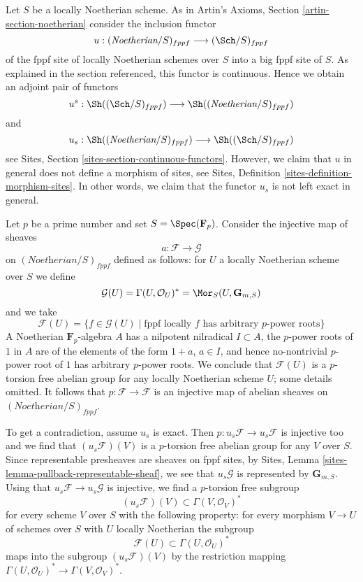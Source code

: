 \noindent
Let $S$ be a locally Noetherian scheme. As in
Artin's Axioms, Section \ref{artin-section-noetherian}
consider the inclusion functor
$$
u : (\textit{Noetherian}/S)_{fppf} \longrightarrow (\Sch/S)_{fppf}
$$
of the fppf site of locally Noetherian schemes over $S$ into a
big fppf site of $S$. As explained in the section referenced,
this functor is continuous. Hence we obtain an adjoint pair of functors
$$
u^s :
\Sh((\Sch/S)_{fppf})
\longrightarrow
\Sh((\textit{Noetherian}/S)_{fppf})
$$
and
$$
u_s :
\Sh((\textit{Noetherian}/S)_{fppf})
\longrightarrow
\Sh((\Sch/S)_{fppf})
$$
see Sites, Section \ref{sites-section-continuous-functors}.
However, we claim that $u$ in general does not define a
morphism of sites, see Sites, Definition \ref{sites-definition-morphism-sites}.
In other words, we claim that the functor $u_s$ is not left exact in general.

\medskip\noindent
Let $p$ be a prime number and set $S = \Spec(\mathbf{F}_p)$.
Consider the injective map of sheaves
$$
a : \mathcal{F} \longrightarrow \mathcal{G}
$$
on $(\textit{Noetherian}/S)_{fppf}$ defined as follows: for $U$
a locally Noetherian scheme over $S$ we define
$$
\mathcal{G}(U) = \Gamma(U, \mathcal{O}_U)^* =
\Mor_S(U, \mathbf{G}_{m, S})
$$
and we take
$$
\mathcal{F}(U) = \{f \in \mathcal{G}(U) \mid \text{fppf locally }f
\text{ has arbitrary }p\text{-power roots}\}
$$
A Noetherian $\mathbf{F}_p$-algebra $A$ has a nilpotent nilradical
$I \subset A$, the $p$-power roots of $1$ in $A$ are of the
elements of the form $1 + a$, $a \in I$, and hence no-nontrivial
$p$-power root of $1$ has arbitrary $p$-power roots. We conclude
that $\mathcal{F}(U)$ is a $p$-torsion free abelian group for any
locally Noetherian scheme $U$; some details omitted. It follows that
$p : \mathcal{F} \to \mathcal{F}$
is an injective map of abelian sheaves on $(\textit{Noetherian}/S)_{fppf}$.

\medskip\noindent
To get a contradiction, assume $u_s$ is exact. Then
$p : u_s\mathcal{F} \to u_s\mathcal{F}$ is injective too
and we find that $(u_s\mathcal{F})(V)$ is a $p$-torsion
free abelian group for any $V$ over $S$. Since
representable presheaves are sheaves on fppf sites, by
Sites, Lemma \ref{sites-lemma-pullback-representable-sheaf},
we see that $u_s\mathcal{G}$ is represented by
$\mathbf{G}_{m, S}$. Using that $u_s\mathcal{F} \to u_s\mathcal{G}$
is injective, we find a $p$-torsion free subgroup
$$
(u_s\mathcal{F})(V) \subset \Gamma(V, \mathcal{O}_V)^*
$$
for every scheme $V$ over $S$ with the following property:
for every morphism $V \to U$ of schemes over $S$ with $U$
locally Noetherian the subgroup
$$
\mathcal{F}(U) \subset \Gamma(U, \mathcal{O}_U)^*
$$
maps into the subgroup $(u_s\mathcal{F})(V)$ by the restriction
mapping $\Gamma(U, \mathcal{O}_U)^* \to \Gamma(V, \mathcal{O}_V)^*$.

